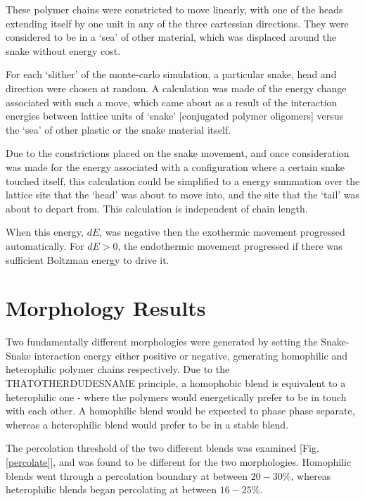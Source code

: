 \documentclass[twocolumn,a4,notitlepage]{article}
\begin{document}
These polymer chains were constricted to move linearly, with one of the
heads extending itself by one unit in any of the three cartessian
directions. They were considered to be in a `sea' of other material, which
was displaced around the snake without energy cost.

For each `slither' of the monte-carlo simulation, a particular snake, head
and direction were chosen at random. A calculation was made of the energy
change associated with such a move, which came about as a result of the
interaction energies between lattice units of `snake' [conjugated polymer
oligomers] versus the `sea' of other plastic or the snake material itself. 

Due to the constrictions placed on the snake movement, and once
consideration was made for the energy associated with a configuration where
a certain snake touched itself, this calculation could be simplified to a
energy summation over the lattice site that the `head' was about to move
into, and the site that the `tail' was about to depart from. This
calculation is independent of chain length.

When this energy, $dE$, was negative then the exothermic movement progressed
automatically. For $dE>0$, the endothermic movement progressed if there was
sufficient Boltzman energy to drive it.

\section{Morphology Results}

Two fundamentally different morphologies were generated by setting the
Snake-Snake interaction energy either positive or negative, generating
homophilic and heterophilic polymer chains respectively. 
Due to the THATOTHERDUDESNAME
principle, a homophobic blend is equivalent to a heterophilic one - where
the polymers would energetically prefer to be in touch with each other.
A homophilic blend would be expected to phase phase separate, whereas a
heterophilic blend would prefer to be in a stable blend.

The percolation threshold of the two different blends was examined [Fig.
\ref{percolate}], and was found to be different for the two morphologies.
Homophilic blends went through a percolation boundary at between $20-30\%$,
whereas heterophilic blends began percolating at between $16-25\%$. 
\end{document}
